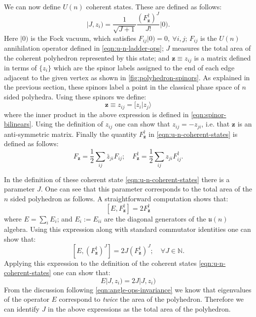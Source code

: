 \documentclass[twocolumn,final,aps,nofootinbib,nobibnotes]{revtex4-2}
\newcommand{\bz}{\mathbf{z}}
\newcommand{\mf}[1]{\mathfrak{#1}}
\newcommand{\bket}[1]{\vert #1 )}
\newcommand{\innerpB}[2]{[ #1 \vert #2 \rangle}
\newcommand{\onehalf}{\frac{1}{2}}
\begin{document}
We can now define $ U(n) $ coherent states. These are defined as follows:
\begin{equation}\label{eqn:u-n-coherent-states}
	\bket{J, z_i} = \frac{1}{\sqrt{J+1}}\frac{(F^\dag_\bz)^J}{J!}\bket{0}.
\end{equation}
Here $ \bket{0} $ is the Fock vacuum, which satisfies $ F_{ij} \bket{0} = 0,~\forall i,j $; $ F_{ij} $ is the $ U(n) $ annihilation operator defined in \eqref{eqn:u-n-ladder-ops}; $ J $ measures the total area of the coherent polyhedron represented by this state; and $ \bz \equiv z_{ij} $ is a matrix defined in terms of $ \{z_i\} $ which are the spinor labels assigned to the end of each edge adjacent to the given vertex as shown in \autoref{fig:polyhedron-spinors}. As explained in the previous section, these spinors label a point in the classical phase space of $ n $ sided polyhedra. Using these spinors we define:
\begin{equation}\label{eqn:spinor-matrix}
	\bz \equiv z_{ij} = \innerpB{z_i}{z_j}
\end{equation}
where the inner product in the above expression is defined in \eqref{eqn:spinor-bilinears}. Using the definition of $ z_{ij} $ one can show that $ z_{ij} = - z_{ji} $, i.e. that $ \bz $ is an anti-symmetric matrix. Finally the quantity $ F^\dag_\bz $ in \eqref{eqn:u-n-coherent-states} is defined as follows:
\begin{equation}\label{eqn:ladder-ops-v2}
	F_\bz = \onehalf \sum_{ij} \bar z_{ji} F_{ij}; \quad F^\dag_\bz = \onehalf \sum_{ij} z_{ji} F^\dag_{ij}.
\end{equation}

In the definition of these coherent state \eqref{eqn:u-n-coherent-states} there is a parameter $ J $. One can see that this parameter corresponds to the total area of the $ n $ sided polyhedron as follows. A straightforward computation shows that:
\begin{equation}\label{eqn:e-f-commutator}
	[E, F^\dag_\bz] = 2 F^\dag_\bz
\end{equation}
where $ E = \sum_i E_i $; and $ E_i := E_{ii} $ are the diagonal generators of the $ \mf{u}(n) $ algebra. Using this expression along with standard commutator identities one can show that:
\begin{equation}\label{eqn:e-f-commutator-v2}
	[E, (F^\dag_\bz)^J] = 2 J (F^\dag_\bz)^J; \quad \forall J \in \mathbb{N}.
\end{equation}
Applying this expression to the definition of the coherent states \eqref{eqn:u-n-coherent-states} one can show that:
\begin{equation}\label{eqn:e-eigenvalue}
	E \bket{J, z_i} = 2 J \bket{J, z_i}
\end{equation}
From the discussion following \eqref{eqn:angle-ops-invariance} we know that eigenvalues of the operator $ E $ correspond to \textit{twice} the area of the polyhedron. Therefore we can identify $ J $ in the above expressions as the total area of the polyhedron.
\end{document}
